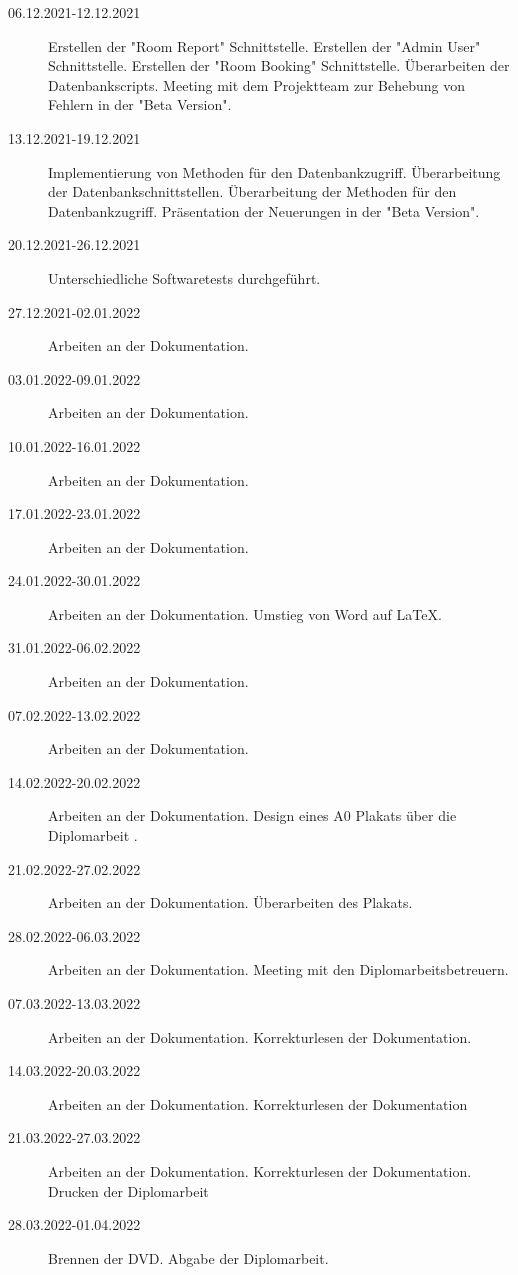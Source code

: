\begin{description}
    \item[06.12.2021-12.12.2021] Erstellen der "Room Report" Schnittstelle. Erstellen der "Admin User" Schnittstelle. Erstellen der "Room Booking" Schnittstelle. Überarbeiten der Datenbankscripts. Meeting mit dem Projektteam zur Behebung von Fehlern in der "Beta Version". 
    \item[13.12.2021-19.12.2021] Implementierung von Methoden für den Datenbankzugriff. Überarbeitung der Datenbankschnittstellen. Überarbeitung der Methoden für den Datenbankzugriff. Präsentation der Neuerungen in der "Beta Version". 
    \item[20.12.2021-26.12.2021] Unterschiedliche Softwaretests durchgeführt. 
    \item[27.12.2021-02.01.2022] Arbeiten an der Dokumentation.
    \item[03.01.2022-09.01.2022] Arbeiten an der Dokumentation.
    \item[10.01.2022-16.01.2022] Arbeiten an der Dokumentation.
    \item[17.01.2022-23.01.2022] Arbeiten an der Dokumentation.
    \item[24.01.2022-30.01.2022] Arbeiten an der Dokumentation. Umstieg von Word auf \mbox{LaTeX}.
    \item[31.01.2022-06.02.2022] Arbeiten an der Dokumentation.
    \item[07.02.2022-13.02.2022] Arbeiten an der Dokumentation.
    \item[14.02.2022-20.02.2022] Arbeiten an der Dokumentation. Design eines A0 Plakats über die Diplomarbeit \ZELIA.
    \item[21.02.2022-27.02.2022] Arbeiten an der Dokumentation. Überarbeiten des Plakats.
    \item[28.02.2022-06.03.2022] Arbeiten an der Dokumentation. Meeting mit den Diplomarbeitsbetreuern.
    \item[07.03.2022-13.03.2022] Arbeiten an der Dokumentation. Korrekturlesen der Dokumentation.
    \item[14.03.2022-20.03.2022] Arbeiten an der Dokumentation. Korrekturlesen der Dokumentation 
    \item[21.03.2022-27.03.2022] Arbeiten an der Dokumentation. Korrekturlesen der Dokumentation. Drucken der Diplomarbeit
    \item[28.03.2022-01.04.2022] Brennen der DVD. Abgabe der Diplomarbeit.
\end{description}